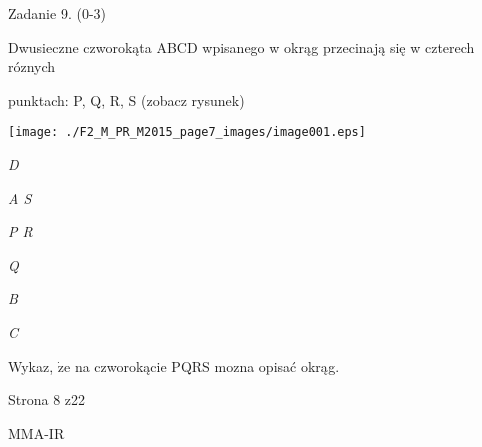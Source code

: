 \documentclass[a4paper,12pt]{article}
\begin{document}
Zadanie 9. (0-3)

Dwusieczne czworokąta ABCD wpisanego w okrąg przecinają się w czterech róznych

punktach: P, Q, R, S (zobacz rysunek)
\begin{center}
\texttt{[image: ./F2\_M\_PR\_M2015\_page7\_images/image001.eps]}
\end{center}
{\it D}

{\it A  S}

{\it P  R}

{\it Q}

{\it B}

{\it C}

Wykaz, $\dot{\mathrm{z}}\mathrm{e}$ na czworokącie PQRS mozna opisać okrąg.

Strona 8 z22

MMA-IR
\end{document}
